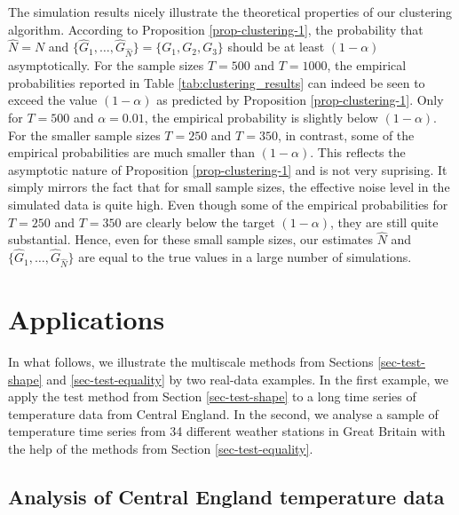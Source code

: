 The simulation results nicely illustrate the theoretical properties of our clustering algorithm. According to Proposition \ref{prop-clustering-1}, the probability that $\widehat{N} = N$ and $\{ \widehat{G}_1,\ldots,\widehat{G}_{\widehat{N}}\} = \{G_1,G_2,G_3\}$ should be at least $(1-\alpha)$ asymptotically. For the sample sizes $T = 500$ and $T = 1000$, the empirical probabilities reported in Table \ref{tab:clustering_results} can indeed be seen to exceed the value $(1-\alpha)$ as predicted by Proposition \ref{prop-clustering-1}. Only for $T = 500$ and $\alpha = 0.01$, the empirical probability is slightly below $(1-\alpha)$. For the smaller sample sizes $T=250$ and $T=350$, in contrast, some of the empirical probabilities are much smaller than $(1-\alpha)$. This reflects the asymptotic nature of Proposition \ref{prop-clustering-1} and is not very suprising. It simply mirrors the fact that for small sample sizes, the effective noise level in the simulated data is quite high. Even though some of the empirical probabilities for $T=250$ and $T=350$ are clearly below the target $(1-\alpha)$, they are still quite substantial. Hence, even for these small sample sizes, our estimates $\widehat{N}$ and $\{ \widehat{G}_1,\ldots,\widehat{G}_{\widehat{N}} \}$ are equal to the true values in a large number of simulations. 



\section{Applications}\label{sec-data}


In what follows, we illustrate the multiscale methods from Sections \ref{sec-test-shape} and \ref{sec-test-equality} by two real-data examples. In the first example, we apply the test method from Section \ref{sec-test-shape} to a long time series of temperature data from Central England. In the second, we analyse a sample of temperature time series from 34 different weather stations in Great Britain with the help of the methods from Section \ref{sec-test-equality}. 


\subsection{Analysis of Central England temperature data}\label{subsec-data-1} 


